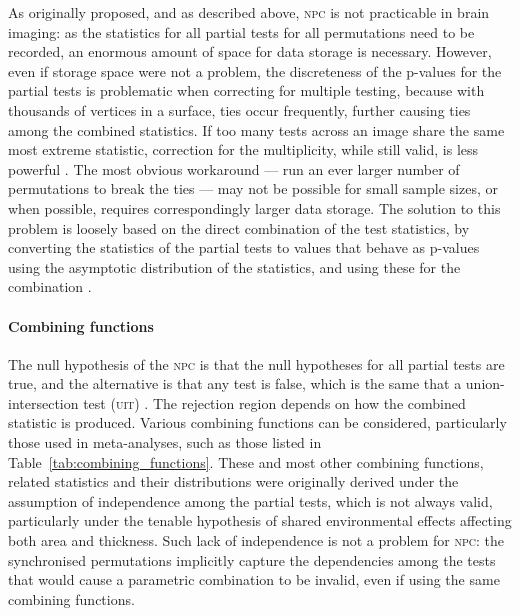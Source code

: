 As originally proposed, and as described above, \textsc{npc} is not practicable in brain imaging: as the statistics for all partial tests for all permutations need to be recorded, an enormous amount of space for data storage is necessary. However, even if storage space were not a problem, the discreteness of the p-values for the partial tests is problematic when correcting for multiple testing, because with thousands of vertices in a surface, ties occur frequently, further causing ties among the combined statistics. If too many tests across an image share the same most extreme statistic, correction for the multiplicity, while still valid, is less powerful \citep{Westfall1993, Pantazis2005}. The most obvious workaround --- run an ever larger number of permutations to break the ties --- may not be possible for small sample sizes, or when possible, requires correspondingly larger data storage. The solution to this problem is loosely based on the direct combination of the test statistics, by converting the statistics of the partial tests to values that behave as p-values using the asymptotic distribution of the statistics, and using these for the combination \citep{Winkler2016_npc}.

\paragraph{Combining functions}

The null hypothesis of the \textsc{npc} is that the null hypotheses for all partial tests are true, and the alternative is that any test is false, which is the same that a union-intersection test (\textsc{uit}) \citep{Roy1953}. The rejection region depends on how the combined statistic is produced. Various combining functions can be considered, particularly those used in meta-analyses, such as those listed in Table~\ref{tab:combining_functions}. These and most other combining functions, related statistics and their distributions were originally derived under the assumption of independence among the partial tests, which is not always valid, particularly under the tenable hypothesis of shared environmental effects affecting both area and thickness. Such lack of independence is not a problem for \textsc{npc}: the synchronised permutations implicitly capture the dependencies among the tests that would cause a parametric combination to be invalid, even if using the same combining functions.


